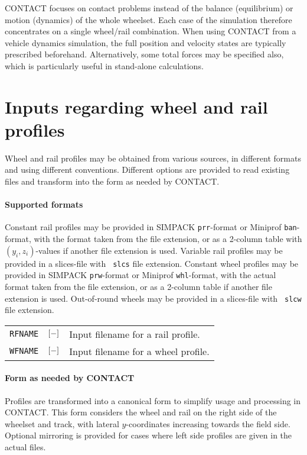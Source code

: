 \documentclass[12pt]{report}
\newenvironment{inputvars}{\vspace{0.4\baselineskip}%

\begin{tabular}{>{\raggedright}p{22mm}p{19mm}p{113mm}}}{
\end{tabular}

}
\newcommand{\inpvar}[3]{{\small\tt #1} & $#2$ & #3 \\[1ex]}
\begin{document}
CONTACT focuses on contact problems instead of the balance (equilibrium)
or motion (dynamics) of the whole wheelset. Each case of the simulation
therefore concentrates on a single wheel/rail combination. When using
CONTACT from a vehicle dynamics simulation, the full position and velocity
states are typically prescribed beforehand. Alternatively, some
total forces may be specified also, which is particularly useful in
stand-alone calculations.

\section{Inputs regarding wheel and rail profiles}
\label{sec:profiles}

Wheel and rail profiles may be obtained from various sources, in different
formats and using different conventions. Different options are provided
to read existing files and transform into the form as needed by CONTACT.

\paragraph{Supported formats}

Constant rail profiles may be provided in SIMPACK {\tt prr}-format or Miniprof
{\tt ban}-format, with the format taken from the file extension, or as a
2-column table with $(y_i,z_i)$-values if another file extension is used.
Variable rail profiles may be provided in a slices-file with {\tt
slcs} file extension. Constant wheel profiles may be provided in SIMPACK
{\tt prw}-format or Miniprof {\tt whl}-format, with the actual format taken
from the file extension, or as a 2-column table if another file extension
is used. Out-of-round wheels may be provided in a slices-file with {\tt
slcw} file extension.
\begin{inputvars}
\inpvar{RFNAME}{\bunit{-}}{Input filename for a rail profile.}
\inpvar{WFNAME}{\bunit{-}}{Input filename for a wheel profile.}
\end{inputvars}

\paragraph{Form as needed by CONTACT}

Profiles are transformed into a canonical form to simplify usage and
processing in CONTACT. This form considers the wheel and rail on the right
side of the wheelset and track, with lateral $y$-coordinates increasing
towards the field side. Optional mirroring is provided for cases where
left side profiles are given in the actual files. 
\end{document}
